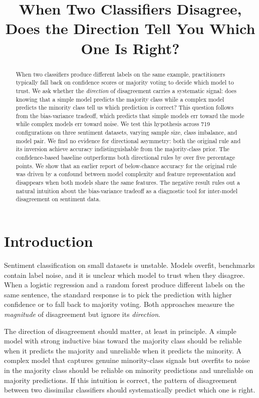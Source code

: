 \documentclass[11pt,letterpaper]{article}
\title{When Two Classifiers Disagree, Does the Direction Tell You Which One Is Right?}
\author{}
\date{}
\begin{document}
\maketitle

\begin{abstract}
When two classifiers produce different labels on the same example, practitioners typically fall back on confidence scores or majority voting to decide which model to trust. We ask whether the \textit{direction} of disagreement carries a systematic signal: does knowing that a simple model predicts the majority class while a complex model predicts the minority class tell us which prediction is correct? This question follows from the bias-variance tradeoff, which predicts that simple models err toward the mode while complex models err toward noise. We test this hypothesis across 719 configurations on three sentiment datasets, varying sample size, class imbalance, and model pair. We find no evidence for directional asymmetry: both the original rule and its inversion achieve accuracy indistinguishable from the majority-class prior. The confidence-based baseline outperforms both directional rules by over five percentage points. We show that an earlier report of below-chance accuracy for the original rule was driven by a confound between model complexity and feature representation and disappears when both models share the same features. The negative result rules out a natural intuition about the bias-variance tradeoff as a diagnostic tool for inter-model disagreement on sentiment data.
\end{abstract}

\section{Introduction}

Sentiment classification on small datasets is unstable. Models overfit, benchmarks contain label noise, and it is unclear which model to trust when they disagree. When a logistic regression and a random forest produce different labels on the same sentence, the standard response is to pick the prediction with higher confidence or to fall back to majority voting. Both approaches measure the \textit{magnitude} of disagreement but ignore its \textit{direction}.

The direction of disagreement should matter, at least in principle. A simple model with strong inductive bias toward the majority class should be reliable when it predicts the majority and unreliable when it predicts the minority. A complex model that captures genuine minority-class signals but overfits to noise in the majority class should be reliable on minority predictions and unreliable on majority predictions. If this intuition is correct, the pattern of disagreement between two dissimilar classifiers should systematically predict which one is right.
\end{document}
